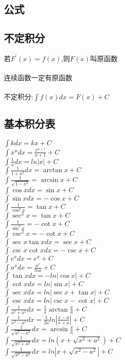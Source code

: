 \documentclass{article}
\begin{document}
\begin{flushleft}
	\huge
	
	\section{公式}
	
	\subsection{不定积分}
	
	若$F^{'}(x)=f(x)$,则$F(x)$叫原函数\\
	~\\
	连续函数一定有原函数\\
	~\\
	不定积分:$\int f(x)dx=F(x)+C$\\
	
	\subsection{基本积分表}
	
	$\int kdx=kx+C$\\
	$\int x^udx=\frac{x^{u+1}}{u+1}+C$\\
	$\int \frac{1}{x}dx=ln|x|+C$\\
	$\int \frac{1}{1+x^2}dx=\arctan x+C$\\
	$\int \frac{1}{\sqrt{1-x^2}}=\arcsin x+C$\\
	$\int \cos xdx=\sin x+C$\\
	$\int \sin xdx=-\cos x+C$\\
	$\int \frac{1}{\cos^2x}=\tan x+C$\\
	$\int \sec^2x=\tan x+C$\\
	$\int \frac{1}{\sin^2x}=-\cot x+C$\\
	$\int \csc^2x=-\cot x+C$\\
	$\int \sec x\tan xdx=\sec x+C$\\
	$\int \csc x\cot xdx=-\csc x+C$\\
	$\int e^xdx=e^x+C$\\
	$\int a^xdx=\frac{a^x}{lna}+C$\\
	$\int \tan xdx=-ln|\cos x|+C$\\
	$\int \cot xdx=ln|\sin x|+C$\\
	$\int \sec xdx=ln|\sec x+\tan x|+C$\\
	$\int \csc xdx=ln|\csc x-\cot x|+C$\\
	$\int \frac{1}{a^2+x^2}dx=\frac{1}{a}\arctan \frac{x}{a}+C$\\
	$\int \frac{1}{x^2-a^2}dx=\frac{1}{2a}ln|\frac{x-a}{x+a}|+C$\\
	$\int \frac{1}{\sqrt{a^2-x^2}}dx=\arcsin \frac{x}{a}+C$\\
	$\int \frac{1}{\sqrt{x^2+a^2}}dx=ln(x+\sqrt{x^2+a^2})+C$\\
	$\int \frac{1}{\sqrt{x^2-a^2}}dx=ln|x+\sqrt{x^2-a^2}|+C$\\
	

\end{flushleft}
\end{document}
